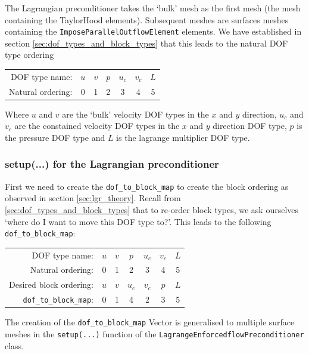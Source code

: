 The Lagrangian preconditioner takes the `bulk' mesh as the first mesh (the mesh containing the TaylorHood elements). Subsequent meshes are surfaces meshes containing the \verb+ImposeParallelOutflowElement+ elements. We have established in section \ref{sec:dof_types_and_block_types} that this leads to the natural DOF type ordering
\begin{center}
    \begin{tabular}{ | r | c c c c c c |}
    \hline
    DOF type name:    & $u$ & $v$ & $p$ & $u_c$ & $v_c$ & $L$ \\ 
    Natural ordering: & 0   &  1  &  2  &   3   &   4   &  5  \\ 
    \hline
    \end{tabular}
\end{center}
Where $u$ and $v$ are the `bulk' velocity DOF types in the $x$ and $y$ direction, $u_c$ and $v_c$ are the constained velocity DOF types in the $x$ and $y$ direction DOF type, $p$ is the pressure DOF type and $L$ is the lagrange multiplier DOF type. 


 \subsubsection{setup(...) for the Lagrangian preconditioner\label{sec:lgr_setup}}
First we need to create the \verb+dof_to_block_map+ to create the block ordering as observed in section \ref{sec:lgr_theory}. Recall from \ref{sec:dof_types_and_block_types} that to re-order block types, we ask ourselves `where do I want to move this DOF type to?'. This leads to the following \verb+dof_to_block_map+:
\begin{center}
    \begin{tabular}{ | r | c c c c c c |}
    \hline
    DOF type name:      & $u$ & $v$ & $p$ & $u_c$  & $v_c$ & $L$ \\ 
    Natural ordering:   & 0   &  1  &  2  &   3    &   4   &  5  \\ 
Desired block ordering: & $u$ & $v$ & $u_c$ & $v_c$& $p$   & $L$ \\ 
\verb+dof_to_block_map+:& 0   &  1  &  4  &   2    &   3   &  5  \\
    \hline
    \end{tabular}
\end{center}
The creation of the \verb+dof_to_block_map+ Vector is generalised to multiple surface meshes in the \verb+setup(...)+ function of the \verb+LagrangeEnforcedflowPreconditioner+ class.



